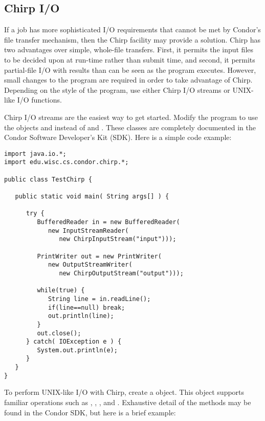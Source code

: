 \subsection{Chirp I/O}

If a job has more sophisticated I/O requirements that cannot
be met by Condor's file transfer mechanism,
then the Chirp facility may provide a solution.
Chirp has two advantages over simple, whole-file transfers.
First, it permits the input files to be decided upon at run-time
rather than submit time, and second,
it permits partial-file I/O with results than can be seen as the
program executes.
However, small changes to the program are required
in order to take advantage of Chirp.
Depending on the style of the program, use either Chirp I/O streams
or UNIX-like I/O functions.

Chirp I/O streams are the easiest way to get started.
Modify the program to use the objects 
and  instead of  and
.
These classes are completely documented
in the Condor Software Developer's Kit (SDK).
Here is a simple code example:

\begin{verbatim}
import java.io.*;
import edu.wisc.cs.condor.chirp.*;

public class TestChirp {

   public static void main( String args[] ) {

      try {
         BufferedReader in = new BufferedReader(
            new InputStreamReader(
               new ChirpInputStream("input")));

         PrintWriter out = new PrintWriter(
            new OutputStreamWriter(
               new ChirpOutputStream("output")));

         while(true) {
            String line = in.readLine();
            if(line==null) break;
            out.println(line);
         }
         out.close();
      } catch( IOException e ) {
         System.out.println(e);
      }
   }
}
\end{verbatim}

To perform UNIX-like I/O with Chirp,
create a  object.
This object supports familiar operations such as , ,
, and .
Exhaustive detail of the methods may be found in the Condor 
SDK, but here is a brief example:

